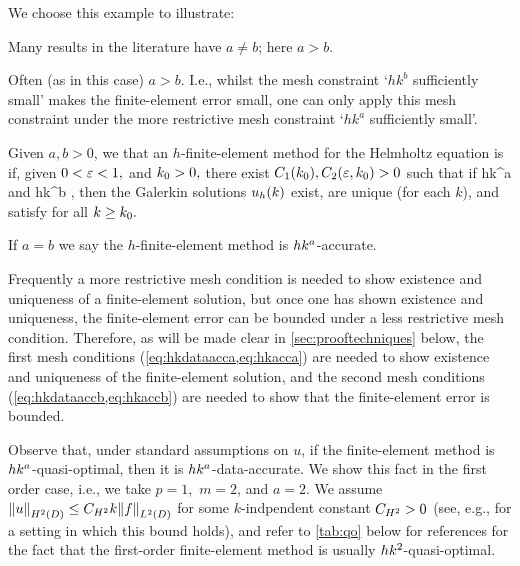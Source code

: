 We choose this example to illustrate:
\bit
\item Many results in the literature have $a \neq b$; here $a > b.$
\item Often (as in this case) $a > b.$ I.e., whilst the mesh constraint `$hk^b$ sufficiently small' makes the finite-element error small, one can only apply this mesh constraint under the more restrictive mesh constraint `$hk^a$ sufficiently small'.
\eit
\ere

\bde[$\hk{a}{b}$-accurate]\label{def:hkacc}
Given $a,b>0$, we that an $h$-finite-element method for the Helmholtz equation is  if, given $0 < \varepsilon < 1,$ and $k_{0} > 0,$ there exist $C_{1}(k_{0}), C_{2}(\varepsilon,k_{0}) > 0$ such that if
\beq\label{eq:hkacca}
hk^a \leq \Co
\eeq
and
\beq\label{eq:hkaccb}
hk^b \leq \Ct,
\eeq
then the Galerkin solutions $u_{h}(k)$ exist, are unique (for each $k$), and satisfy
\beq\label{eq:hkacc}
 \leq \eps
\eeq
for all $k \geq k_{0}.$

If $a=b$ we say the $h$-finite-element method is $hk^{a}$-accurate.
\ede

Frequently a more restrictive mesh condition is needed to show existence and uniqueness of a finite-element solution, but once one has shown existence and uniqueness, the finite-element error can be bounded under a less restrictive mesh condition. Therefore, as will be made clear in \cref{sec:prooftechniques} below, the first mesh conditions (\cref{eq:hkdataacca,eq:hkacca}) are needed to show existence and uniqueness of the finite-element solution, and the second mesh conditions (\cref{eq:hkdataaccb,eq:hkaccb}) are needed to show that the finite-element error is bounded.
\ere

Observe that, under standard assumptions on $u$, if the finite-element method is $hk^{a}$-quasi-optimal, then it is $hk^{a}$-data-accurate. We show this fact in the first order case, i.e., we take $p=1,$ $m=2$, and $a=2.$ We assume $\NHtD{u} \leq\CHt k\NLtD{f}$ for some $k$-indpendent constant $C_{H^{2}}>0$ (see, e.g., \cite[Lemma 2.12]{GaGrSp:15} for a setting in which this bound holds), and refer to  \cref{tab:qo} below for references for the fact that the first-order finite-element method is usually $hk^{2}$-quasi-optimal.

